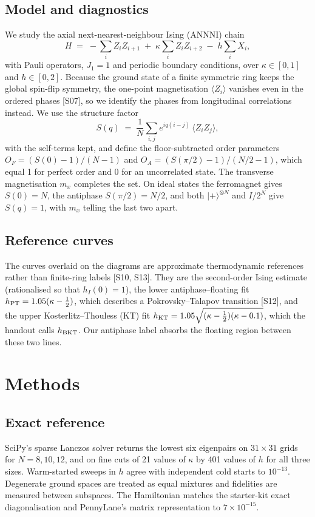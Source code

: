 \documentclass[10pt,twocolumn]{article}
\begin{document}
\subsection{Model and diagnostics}
We study the axial next-nearest-neighbour Ising (ANNNI) chain
\begin{equation}
H \;=\; -\sum_i Z_iZ_{i+1} \;+\; \kappa\sum_i Z_iZ_{i+2} \;-\; h\sum_i X_i ,
\label{eq:H}
\end{equation}
with Pauli operators, $J_1=1$ and periodic boundary conditions, over $\kappa\in[0,1]$ and $h\in[0,2]$. Because the ground state of a finite symmetric ring keeps the global spin-flip symmetry, the one-point magnetisation $\langle Z_i\rangle$ vanishes even in the ordered phases [S07], so we identify the phases from longitudinal correlations instead. We use the structure factor
\begin{equation}
S(q) \;=\; \frac1N\sum_{i,j} e^{iq(i-j)}\,\langle Z_iZ_j\rangle ,
\end{equation}
with the self-terms kept, and define the floor-subtracted order parameters $O_F=(S(0)-1)/(N-1)$ and $O_A=(S(\pi/2)-1)/(N/2-1)$, which equal 1 for perfect order and 0 for an uncorrelated state. The transverse magnetisation $m_x$ completes the set. On ideal states the ferromagnet gives $S(0)=N$, the antiphase $S(\pi/2)=N/2$, and both $|+\rangle^{\otimes N}$ and $I/2^N$ give $S(q)=1$, with $m_x$ telling the last two apart.

\subsection{Reference curves}
The curves overlaid on the diagrams are approximate thermodynamic references rather than finite-ring labels [S10, S13]. They are the second-order Ising estimate (rationalised so that $h_I(0)=1$), the lower antiphase--floating fit $h_{\rm PT}=1.05(\kappa-\tfrac12)$, which describes a Pokrovsky--Talapov transition [S12], and the upper Kosterlitz--Thouless (KT) fit $h_{\rm KT}=1.05\sqrt{(\kappa-\tfrac12)(\kappa-0.1)}$, which the handout calls $h_{\rm BKT}$. Our antiphase label absorbs the floating region between these two lines.

\section{Methods}

\subsection{Exact reference}
SciPy's sparse Lanczos solver returns the lowest six eigenpairs on $31\times31$ grids for $N=8,10,12$, and on fine cuts of 21 values of $\kappa$ by 401 values of $h$ for all three sizes. Warm-started sweeps in $h$ agree with independent cold starts to $10^{-13}$. Degenerate ground spaces are treated as equal mixtures and fidelities are measured between subspaces. The Hamiltonian matches the starter-kit exact diagonalisation and PennyLane's matrix representation to $7\times10^{-15}$.
\end{document}
